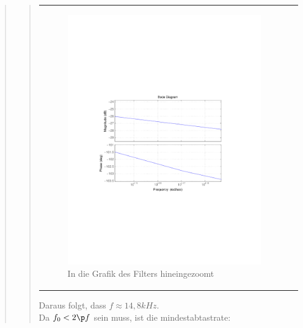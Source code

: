 \begin{quote}
\begin{quote}
\begin{center}
\begin{tabular}{ll}
            \begin{minipage}{0.6\textwidth}
                \begin{figure}[H]
                    \label{fig:butter_2}
                    \includegraphics[scale=0.7, trim = 3.5cm 7cm 3.5cm 7cm, clip]{Bilder/butter_2_zoom} %
                    \caption{In die Grafik des Filters hineingezoomt}
                \end{figure}
            \vspace{-0.4cm}
                                    
            \end{minipage}
        
        \end{tabular}
        \end{center}
            
        \vspace{1.5 cm}    
        Daraus folgt, dass $f \approx 14,8 kHz$.\\
        Da $f_0 < 2 \p f$ sein muss, ist die mindestabtastrate:\\
         

\end{quote}
\end{quote}
